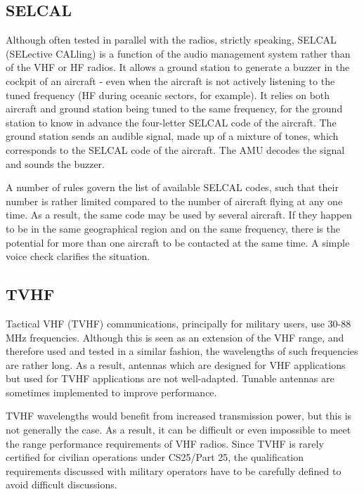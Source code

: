 \documentclass[
]{book}
\begin{document}
\hypertarget{selcal}{%
\subsection{SELCAL}\label{selcal}}

Although often tested in parallel with the radios, strictly speaking, SELCAL
(SELective CALling) is a function of the audio management system rather than of
the VHF or HF radios. It allows a ground station to generate a buzzer in the
cockpit of an aircraft - even when the aircraft is not actively listening to
the tuned frequency (HF during oceanic sectors, for example). It relies on both
aircraft and ground station being tuned to the same frequency, for the ground
station to know in advance the four-letter SELCAL code of the aircraft. The
ground station sends an audible signal, made up of a mixture of tones, which
corresponds to the SELCAL code of the aircraft. The AMU decodes the signal and
sounds the buzzer.

A number of rules govern the list of available SELCAL codes, such that their
number is rather limited compared to the number of aircraft flying at any one
time. As a result, the same code may be used by several aircraft. If they
happen to be in the same geographical region and on the same frequency, there
is the potential for more than one aircraft to be contacted at the same time. A
simple voice check clarifies the situation.

\hypertarget{tvhf}{%
\subsection{TVHF}\label{tvhf}}

Tactical VHF (TVHF) communications, principally for military users, use 30-88
MHz frequencies. Although this is seen as an extension of the VHF range, and
therefore used and tested in a similar fashion, the wavelengths of such
frequencies are rather long. As a result, antennas which are designed for VHF
applications but used for TVHF applications are not well-adapted. Tunable
antennas are sometimes implemented to improve performance.

TVHF wavelengths would benefit from increased transmission power, but this is
not generally the case. As a result, it can be difficult or even impossible to
meet the range performance requirements of VHF radios. Since TVHF is rarely
certified for civilian operations under CS25/Part 25, the qualification
requirements discussed with military operators have to be carefully defined to
avoid difficult discussions.
\end{document}
